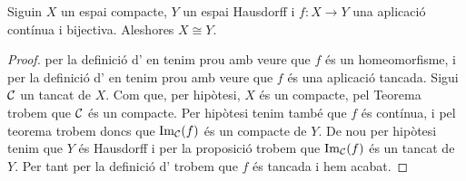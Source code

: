 \documentclass[../Apunts.tex]{subfiles}
\begin{document}
	\begin{theorem}
		Siguin \(X\) un espai compacte, \(Y\) un espai Hausdorff i \(f\colon X\longrightarrow Y\) una aplicació contínua i bijectiva. Aleshores \(X\cong Y\).
		\begin{proof}
			per la definició d' en tenim prou amb veure que \(f\) és un homeomorfisme, i per la definició d' en tenim prou amb veure que \(f\) és una aplicació tancada. Sigui \(\mathcal{C}\) un tancat de \(X\). Com que, per hipòtesi, \(X\) és un compacte, pel Teorema  trobem que \(\mathcal{C}\) és un compacte. Per hipòtesi tenim també que \(f\) és contínua, i pel teorema  trobem doncs que \(\operatorname{Im}_{\mathcal{C}}(f)\) és un compacte de \(Y\). De nou per hipòtesi tenim que \(Y\) és Hausdorff i per la proposició  trobem que \(\operatorname{Im}_{\mathcal{C}}(f)\) és un tancat de \(Y\). Per tant per la definició d' trobem que \(f\) és tancada i hem acabat.
		\end{proof}
	\end{theorem}
\end{document}
